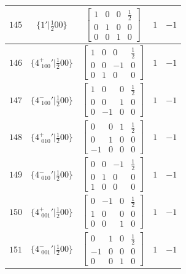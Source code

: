 \documentclass[fleqn,8pt]{jsarticle}
\begin{document}
\begin{longtable}{ccccc}
$ 145 $ & $ \{1{}'|\frac{1}{2} 0 0\} $ & $ \begin{bmatrix} 1 & 0 & 0 & \frac{1}{2} \\ 0 & 1 & 0 & 0 \\ 0 & 0 & 1 & 0 \end{bmatrix} $ & $ 1 $ & $ -1 $ \\ \hline
$ 146 $ & $ \{4^{+}_{\,\,100}{}'|\frac{1}{2} 0 0\} $ & $ \begin{bmatrix} 1 & 0 & 0 & \frac{1}{2} \\ 0 & 0 & -1 & 0 \\ 0 & 1 & 0 & 0 \end{bmatrix} $ & $ 1 $ & $ -1 $ \\ \hline
$ 147 $ & $ \{4^{-}_{\,\,100}{}'|\frac{1}{2} 0 0\} $ & $ \begin{bmatrix} 1 & 0 & 0 & \frac{1}{2} \\ 0 & 0 & 1 & 0 \\ 0 & -1 & 0 & 0 \end{bmatrix} $ & $ 1 $ & $ -1 $ \\ \hline
$ 148 $ & $ \{4^{+}_{\,\,010}{}'|\frac{1}{2} 0 0\} $ & $ \begin{bmatrix} 0 & 0 & 1 & \frac{1}{2} \\ 0 & 1 & 0 & 0 \\ -1 & 0 & 0 & 0 \end{bmatrix} $ & $ 1 $ & $ -1 $ \\ \hline
$ 149 $ & $ \{4^{-}_{\,\,010}{}'|\frac{1}{2} 0 0\} $ & $ \begin{bmatrix} 0 & 0 & -1 & \frac{1}{2} \\ 0 & 1 & 0 & 0 \\ 1 & 0 & 0 & 0 \end{bmatrix} $ & $ 1 $ & $ -1 $ \\ \hline
$ 150 $ & $ \{4^{+}_{\,\,001}{}'|\frac{1}{2} 0 0\} $ & $ \begin{bmatrix} 0 & -1 & 0 & \frac{1}{2} \\ 1 & 0 & 0 & 0 \\ 0 & 0 & 1 & 0 \end{bmatrix} $ & $ 1 $ & $ -1 $ \\ \hline
$ 151 $ & $ \{4^{-}_{\,\,001}{}'|\frac{1}{2} 0 0\} $ & $ \begin{bmatrix} 0 & 1 & 0 & \frac{1}{2} \\ -1 & 0 & 0 & 0 \\ 0 & 0 & 1 & 0 \end{bmatrix} $ & $ 1 $ & $ -1 $ \\ \hline

\end{longtable}
\end{document}
